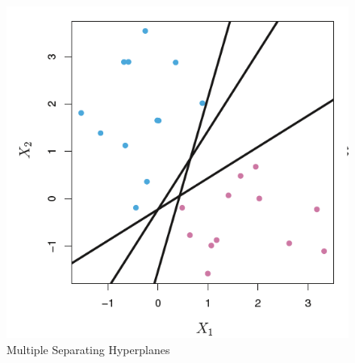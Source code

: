 \documentclass[11pt,a4paper,oneside]{article}
\begin{document}
\begin{figure}[t!]
    \centering
    \includegraphics[scale = 0.5]{Figures/figure1.png}
    \caption{Multiple Separating Hyperplanes}
    \label{fig:figure1}
\end{figure}
\end{document}
